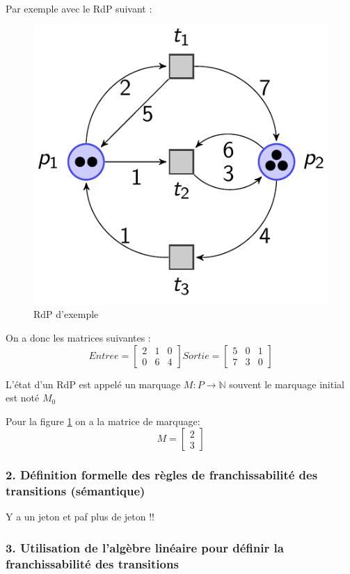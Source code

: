 \documentclass[12pt,a4paper,oneside]{article}
\begin{document}
		Par exemple avec le RdP suivant :

		\begin{figure}[h]
			\includegraphics[scale = 0.5]{./img/exrdp.png}
			\centering
			\caption{RdP d'exemple}
			\label{exrdp}
		\end{figure}

		On a donc les matrices suivantes :
		$$Entree = \begin{bmatrix}
			2 & 1 & 0 \\
			0 & 6 & 4
		\end{bmatrix}
		Sortie = \begin{bmatrix}
			5 & 0 & 1 \\
			7 & 3 & 0
		\end{bmatrix}$$

		L'état d'un RdP est appelé un marquage $M:P\to \mathbb{N}$ souvent le marquage initial est noté $M_0$

		Pour la figure \ref{exrdp} on a la matrice de marquage:
		$$M = \begin{bmatrix}
			2\\
			3
		\end{bmatrix}$$
	\subsubsection*{2. Définition formelle des règles de franchissabilité des transitions (sémantique)}
		Y a un jeton et paf plus de jeton !!

	\subsubsection*{3. Utilisation de l’algèbre linéaire pour définir la franchissabilité des transitions}
\end{document}
